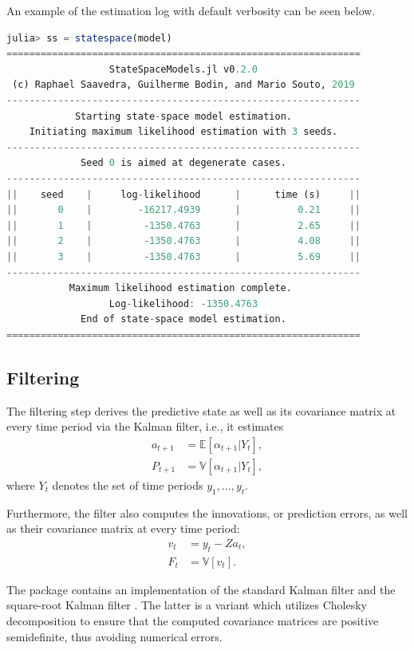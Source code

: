 \documentclass{juliacon}
\begin{document}
An example of the estimation log with default verbosity can be seen below.
%
\begin{lstlisting}[language = Julia]
julia> ss = statespace(model)
==============================================================
                  StateSpaceModels.jl v0.2.0
 (c) Raphael Saavedra, Guilherme Bodin, and Mario Souto, 2019
--------------------------------------------------------------
            Starting state-space model estimation.
    Initiating maximum likelihood estimation with 3 seeds.
--------------------------------------------------------------
             Seed 0 is aimed at degenerate cases.
--------------------------------------------------------------
||    seed    |     log-likelihood      |      time (s)     ||
||       0    |        -16217.4939      |          0.21     ||
||       1    |         -1350.4763      |          2.65     ||
||       2    |         -1350.4763      |          4.08     ||
||       3    |         -1350.4763      |          5.69     ||
--------------------------------------------------------------
           Maximum likelihood estimation complete.
                  Log-likelihood: -1350.4763
             End of state-space model estimation.
==============================================================
\end{lstlisting}

\subsection{Filtering}

The filtering step derives the predictive state as well as its covariance matrix at every time period via the Kalman filter, i.e., it estimates
%
\begin{align}
    a_{t+1} &= \mathbb{E}[\alpha_{t+1} | Y_{t}], \\
    P_{t+1} &= \mathbb{V}[\alpha_{t+1} | Y_{t}],
\end{align}
%
where $Y_{t}$ denotes the set of time periods $y_{1}, \dots, y_{t}$.

Furthermore, the filter also computes the innovations, or prediction errors, as well as their covariance matrix at every time period:
%
\begin{align}
    v_{t} &= y_{t} - Z a_{t}, \\
    F_{t} &= \mathbb{V}[v_{t}].
\end{align}
%

The package contains an implementation of the standard Kalman filter and the square-root Kalman filter \cite{durbin2012time}. The latter is a variant which utilizes Cholesky decomposition to ensure that the computed covariance matrices are positive semidefinite, thus avoiding numerical errors.
\end{document}
